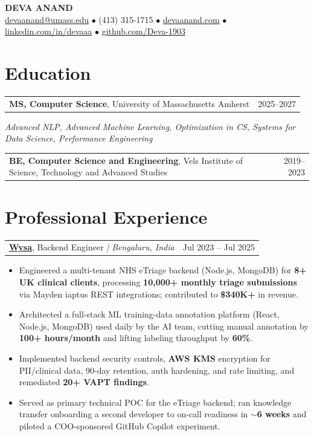 \documentclass[letterpaper,11pt]{article}
\makeatletter
\newcommand{\eduItem}[3]{%
  \begin{tabular*}{\textwidth}{@{}l@{\extracolsep{\fill}}r@{}}
    \textbf{#1}, #2 & #3 \\
  \end{tabular*}\par
}
\newcommand{\expItem}[4]{%
  \vspace{3pt}
  \begin{tabular*}{\textwidth}{@{}l@{\extracolsep{\fill}}r@{}}
    \textbf{#1}, #2 \textit{| #3} & #4 \\
  \end{tabular*}\par\vspace{-2pt}
}
\makeatother
\begin{document}
\begin{center}
    {\fontsize{18}{20}\selectfont\bfseries DEVA ANAND}\\ \vspace{3pt}
    {\small
    \href{mailto:devaanand@umass.edu}{devaanand@umass.edu}
    \enspace$\bullet$\enspace
    (413) 315-1715
    \enspace$\bullet$\enspace
    \href{https://devaanand.com}{devaanand.com}
    \enspace$\bullet$\enspace
    \href{https://linkedin.com/in/devaaa/}{linkedin.com/in/devaaa}
    \enspace$\bullet$\enspace
    \href{https://github.com/Deva-1903}{github.com/Deva-1903}}
\end{center}
\vspace{-6pt}

\section{Education}
\eduItem{MS, Computer Science}{University of Massachusetts Amherst}{2025--2027}
{\small\textit{Advanced NLP, Advanced Machine Learning, Optimization in CS, Systems for Data Science, Performance Engineering}}\par
\vspace{3pt}
\eduItem{BE, Computer Science and Engineering}{Vels Institute of Science, Technology and Advanced Studies}{2019--2023}

\section{Professional Experience}

\expItem{\href{https://www.wysa.io}{Wysa}}{Backend Engineer}{Bengaluru, India}{Jul 2023 -- Jul 2025}
\begin{itemize}
  \item Engineered a multi-tenant NHS eTriage backend (Node.js, MongoDB) for \textbf{8+ UK clinical clients}, processing \textbf{10{,}000+ monthly triage submissions} via Mayden iaptus REST integrations; contributed to \textbf{\$340K+} in revenue.
  \item Architected a full-stack ML training-data annotation platform (React, Node.js, MongoDB) used daily by the AI team, cutting manual annotation by \textbf{100+ hours/month} and lifting labeling throughput by \textbf{60\%}.
  \item Implemented backend security controls, \textbf{AWS KMS} encryption for PII/clinical data, 90-day retention, auth hardening, and rate limiting, and remediated \textbf{20+ VAPT findings}.
  \item Served as primary technical POC for the eTriage backend; ran knowledge transfer onboarding a second developer to on-call readiness in \textbf{$\sim$6 weeks} and piloted a COO-sponsored GitHub Copilot experiment.
\end{itemize}
\end{document}
